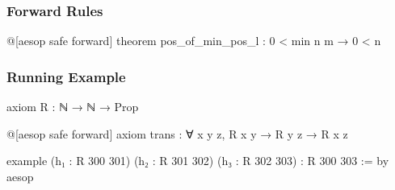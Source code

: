 \documentclass[xetex]{beamer}
\newcommand{\orange}[1]{\textcolor{orange}{#1}}
\begin{document}
\begin{frame}[fragile]
  \frametitle{Forward Rules}

  \begin{leancode}
    @[aesop safe forward]
    theorem pos_of_min_pos_l : 0 < min n m → 0 < n
  \end{leancode}

  \begin{tcolorbox}
    \begin{center}
    \end{center}
  \end{tcolorbox}
\end{frame}

\begin{frame}[fragile]
  \frametitle{Running Example}

  \begin{leancode}
    axiom R : ℕ → ℕ → Prop

    @[aesop safe forward]
    axiom trans : ∀ x y z, R x y → R y z → R x z

    example
        (h₁ : R 300 301)
        (h₂ : R 301 302)
        (h₃ : R 302 303) :
        R 300 303 := by
      aesop
  \end{leancode}
\end{frame}
\end{document}

